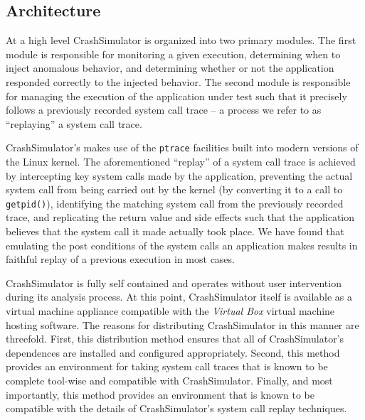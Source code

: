     \subsection{Architecture}
        
    At a high level CrashSimulator is organized into two primary modules. The
    first module is responsible for monitoring a given execution, determining
    when to inject anomalous behavior, and determining whether or not the
    application responded correctly to the injected behavior. The second module
    is responsible for managing the execution of the application under test such
    that it precisely follows a previously recorded system call trace -- a
    process we refer to as ``replaying'' a system call trace.

        
    CrashSimulator's makes use of the {\tt ptrace} facilities built into modern
    versions of the Linux kernel. The aforementioned ``replay'' of a system call
    trace is achieved by intercepting key system calls made by the application,
    preventing the actual system call from being carried out by the kernel (by
    converting it to a call to {\tt getpid()}), identifying the matching system
    call from the previously recorded trace, and replicating the return value
    and side effects such that the application believes that the system call it
    made actually took place. We have found that emulating the post conditions
    of the system calls an application makes results in faithful replay of a
    previous execution in most cases.

    CrashSimulator is fully self contained and operates without user
    intervention during its analysis process. At this point, CrashSimulator
    itself is available as a virtual machine appliance compatible with the
    \emph{Virtual Box} virtual machine hosting software.  The reasons for
    distributing CrashSimulator in this manner are threefold.  First, this
    distribution method ensures that all of CrashSimulator's dependences are
    installed and configured appropriately.  Second, this method provides an
    environment for taking system call traces that is known to be complete
    tool-wise and compatible with CrashSimulator.  Finally, and most importantly,
    this method provides an environment that is known to be compatible with the
    details of CrashSimulator's system call replay techniques.

